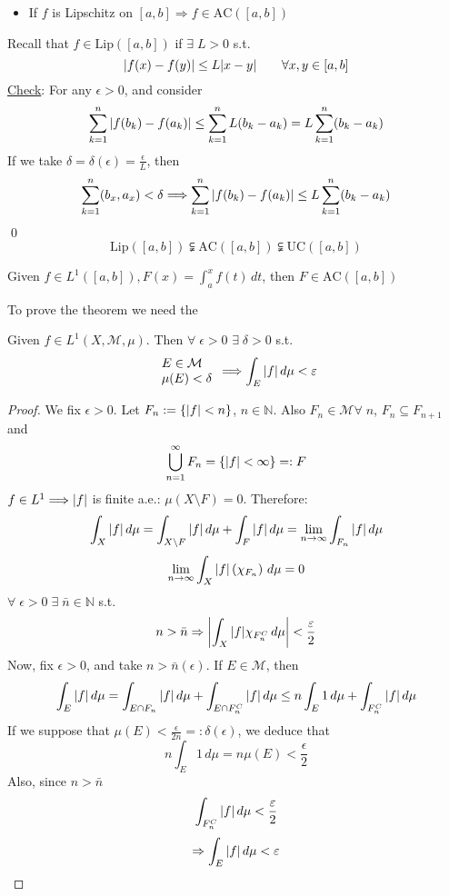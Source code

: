 \begin{itemize}
    \item If \(f\) is Lipschitz on \([a,b] \Longrightarrow f \in \text{AC}([a,b])\) 
\end{itemize}
Recall that \(f \in \mbox{Lip}([a,b])\) if \(\exists \; L > 0\) s.t. 
\[
    \abs{f(x) - f(y)} \leq L\abs{x-y} \qquad \forall x, y \in \left[a, b\right]
\]
\underline{Check}: For any \(\epsilon > 0\), and consider 
\[
    \sum_{k=1}^n \abs{f(b_k)-f(a_k)} \leq \sum_{k=1}^n L(b_k-a_k) = L \sum_{k=1}^n (b_k-a_k)
\]
If we take \(\delta = \delta(\epsilon) = \frac{\epsilon}{L}\), then 
\[
    \sum_{k=1}^n (b_x, a_x) < \delta \Longrightarrow \sum_{k=1}^n \abs{f(b_k)-f(a_k) } \leq L \sum_{k=1}^n (b_k-a_k)
\]
\qed
\[
    \mbox{Lip}([a,b]) \subsetneqq \mbox{AC}([a,b]) \subsetneqq \mbox{UC}([a,b])
\]
\begin{theorem}
    Given \(f \in L^1([a,b]), F(x) = \int_a^xf(t) \, dt\), then \(F \in \mbox{AC}([a,b])\)
\end{theorem}
To prove the theorem we need the
\begin{theorem}
    Given \(f \in L^1(X, \mathcal{M}, \mu)\). Then \(\forall \; \epsilon >0 \) \(\exists \; \delta > 0\) s.t.     
    \[
        \begin{array}{l}
            E \in \mathcal{M} \\
            \mu(E) < \delta
        \end{array} 
        \Longrightarrow \int_E \abs{f} \, d\mu < \varepsilon
    \]
\end{theorem}
\begin{proof}
    We fix \(\epsilon > 0\). Let \(F_n := \left\{ \abs{f} < n \right\}\), \(n \in \mathbb{N}\). Also \(F_n \in \mathcal{M} \forall \; n\), \(F_n \subseteq F_{n+1}\) and 
    \[
        \bigcup_{n=1}^{\infty} F_n = \left\{ \abs{f} < \infty \right\} =: F
    \]
    \(f \in L^1 \Longrightarrow \abs{f}\) is finite a.e.: \(\mu(X \setminus F) =0\).
    Therefore:
    \[
        \int_X \abs{f} \, d\mu = \int_{X \setminus F} \abs{f} \, d\mu + \int_F \abs{f} \, d\mu 
        = \lim_{n \to\infty} \int_{F_n} \abs{f} \, d\mu
    \]
    \[
        \lim_{n\to\infty} \int_X \abs{f} \left(\- \chi_{F_n} \right) \, d\mu =0
    \]
    \(\forall \; \epsilon >0 \; \exists \; \bar{n} \in \mathbb{N}\) s.t. 
    \[
        n > \bar{n} \Rightarrow \abs{\int_X \abs{f} \chi_{F_n^C} \, d\mu} < \frac{\varepsilon}{2}
    \]
    Now, fix \(\epsilon >0 \), and take \(n > \bar{n}(\epsilon)\). If \(E \in \mathcal{M}\), then
    \[
        \int_E \abs{f} \, d\mu = \int_{E \cap F_n} \abs{f} \, d\mu + \int_{E \cap F_n^C} \abs{f} \, d\mu
        \leq n \int_E 1 \, d\mu + \int_{F_n^C} \abs{f} \, d\mu 
    \]
    If we suppose that \(\mu(E) < \frac{\epsilon}{2n} =: \delta(\epsilon)\), we deduce that
    \[
        n \int_E 1 \, d\mu = n \mu(E) < \frac{\epsilon}{2}
    \]
    Also, since \(n > \bar{n}\)
    \[
        \int_{F_n^C} \abs{f} \, d\mu < \frac{\varepsilon}{2}
    \]
    \[
        \Rightarrow \int_E \abs{f} \, d\mu < \varepsilon \]
\end{proof}
